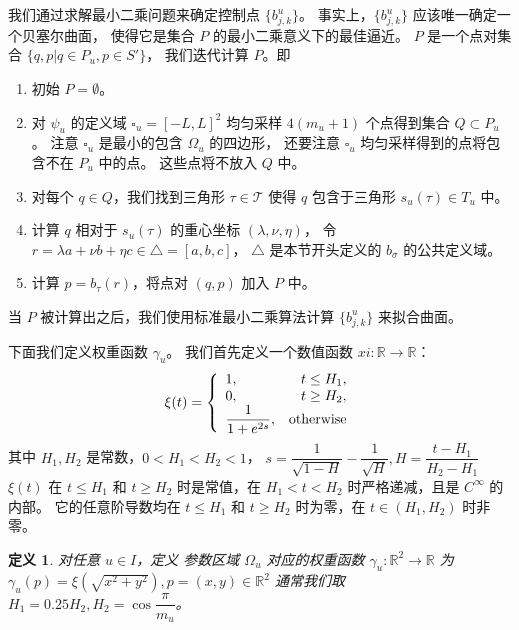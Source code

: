 \documentclass{ctexart}
\newtheorem{Def}{定义}
\begin{document}
		我们通过求解最小二乘问题来确定控制点 $\{b_{j,k}^u\}$。
		事实上，$\{b_{j,k}^u\}$ 应该唯一确定一个贝塞尔曲面，
		使得它是集合 $P$ 的最小二乘意义下的最佳逼近。
		$P$ 是一个点对集合 $\{q,p|q\in P_u,p\in S'\}$，
		我们迭代计算 $P$。即
		
		\begin{enumerate}
			\item 初始 $P=\emptyset$。
			\item
				对 $\psi_u$ 的定义域 $\square_u = [-L,L]^2$ 均匀采样 $4(m_u+1)$ 个点得到集合 $Q\subset P_u$。
				注意 $\square_u$ 是最小的包含 $\Omega_u$ 的四边形，
				还要注意 $\square_u$ 均匀采样得到的点将包含不在 $P_u$ 中的点。
				这些点将不放入 $Q$ 中。
			\item
				对每个 $q\in Q$，我们找到三角形 $\tau \in \mathcal{T}$ 使得
				$q$ 包含于三角形 $s_u(\tau)\in T_u$ 中。
			\item
				计算 $q$ 相对于 $s_u(\tau)$ 的重心坐标 $(\lambda,\nu,\eta)$，
				令 $r=\lambda a+\nu b+\eta c\in \triangle=[a,b,c]$，
				$\triangle$ 是本节开头定义的 $b_{\sigma}$ 的公共定义域。
			\item
				计算 $p=b_{\tau}(r)$，将点对 $(q,p)$ 加入 $P$ 中。
		\end{enumerate}

		当 $P$ 被计算出之后，我们使用标准最小二乘算法计算 $\{b_{j,k}^u\}$ 来拟合曲面。
		
		下面我们定义权重函数 $\gamma_u$。
		我们首先定义一个数值函数 $xi:\mathbb{R}\rightarrow \mathbb{R}$：
		\begin{equation}
			\xi(t)=
			\begin{aligned}
				\left\{
					\begin{array}{lr}
						1, & t\leq H_1, \\
						0, & t\geq H_2, \\
						\dfrac 1{1+e^{2s}}, & \rm{otherwise}\\
					\end{array}
				\right.
			\end{aligned}
		\end{equation}
		其中 $H_1,H_2$ 是常数，$0<H_1<H_2<1$，
		$s = \dfrac{1}{\sqrt{1-H}} - \dfrac{1}{\sqrt H},H = \dfrac{t-H_1}{H_2-H_1}$
		$\xi(t)$ 在 $t\leq H_1$ 和 $t\geq H_2$ 时是常值，在 $H_1<t<H_2$ 时严格递减，且是 $C^{\infty}$ 的内部。
		它的任意阶导数均在 $t\leq H_1$ 和 $t\geq H_2$ 时为零，在 $t\in (H_1,H_2)$ 时非零。

		\begin{Def}\label{WF-def}
			对任意 $u\in I$，定义
			参数区域 $\Omega_u$ 对应的权重函数 $\gamma_u:\mathbb{R}^2\rightarrow \mathbb{R}$ 为
			$\gamma_u(p) = \xi(\sqrt{x^2+y^2}),p=(x,y)\in \mathbb{R}^2$
			通常我们取 $H_1=0.25H_2,H_2=\cos\dfrac{\pi}{m_u}$。
		\end{Def}
\end{document}
